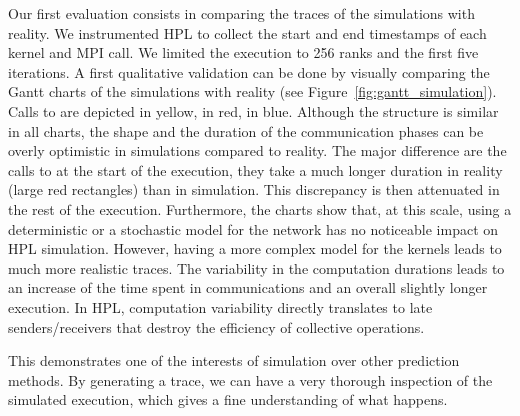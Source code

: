         Our first evaluation consists in comparing the traces of the simulations with reality. We instrumented HPL to
        collect the start and end timestamps of each kernel and MPI call. We limited the execution to 256 ranks and the
        first five iterations.  A first qualitative validation can be done by visually comparing the Gantt charts of the
        simulations with reality (see Figure~\ref{fig:gantt_simulation}). Calls to \dgemm are depicted in yellow, \send
        in red, \recv in blue. Although the structure is similar in all charts, the shape and the duration of the
        communication phases can be overly optimistic in simulations compared to reality. The major difference are the
        calls to \send at the start of the execution, they take a much longer duration in reality (large red rectangles)
        than in simulation. This discrepancy is then attenuated in the rest of the execution. Furthermore, the charts
        show that, at this scale, using a deterministic or a stochastic model for the network has no noticeable impact
        on HPL simulation.  However, having a more complex model for the kernels leads to much more realistic traces.
        The variability in the computation durations leads to an increase of the time spent in communications and an
        overall slightly longer execution. In HPL, computation variability directly translates to late senders/receivers
        that destroy the efficiency of collective operations.

        This demonstrates one of the interests of simulation over other prediction methods. By generating a trace, we
        can have a very thorough inspection of the simulated execution, which gives a fine understanding of what
        happens.

